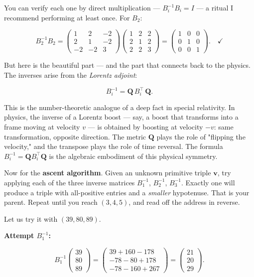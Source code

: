 You can verify each one by direct multiplication --- $B_i^{-1} B_i = I$ --- a ritual I recommend performing at least once. For $B_2$:

\[
B_2^{-1} B_2 = \begin{pmatrix} 1 & 2 & -2 \\ 2 & 1 & -2 \\ -2 & -2 & 3 \end{pmatrix} \begin{pmatrix} 1 & 2 & 2 \\ 2 & 1 & 2 \\ 2 & 2 & 3 \end{pmatrix} = \begin{pmatrix} 1 & 0 & 0 \\ 0 & 1 & 0 \\ 0 & 0 & 1 \end{pmatrix}. \quad \checkmark
\]

But here is the beautiful part --- and the part that connects back to the physics. The inverses arise from the \textit{Lorentz adjoint}:

\[
B_i^{-1} = \mathbf{Q} \, B_i^\top \, \mathbf{Q}.
\]

This is the number-theoretic analogue of a deep fact in special relativity. In physics, the inverse of a Lorentz boost --- say, a boost that transforms into a frame moving at velocity $v$ --- is obtained by boosting at velocity $-v$: same transformation, opposite direction. The metric $\mathbf{Q}$ plays the role of "flipping the velocity," and the transpose plays the role of time reversal. The formula $B_i^{-1} = \mathbf{Q} B_i^\top \mathbf{Q}$ is the algebraic embodiment of this physical symmetry.

Now for the \textbf{ascent algorithm}. Given an unknown primitive triple $\mathbf{v}$, try applying each of the three inverse matrices $B_1^{-1}$, $B_2^{-1}$, $B_3^{-1}$. Exactly one will produce a triple with all-positive entries and a \textit{smaller} hypotenuse. That is your parent. Repeat until you reach $(3, 4, 5)$, and read off the address in reverse.

Let us try it with $(39, 80, 89)$.

\textbf{Attempt $B_1^{-1}$:}

\[
B_1^{-1} \begin{pmatrix} 39 \\ 80 \\ 89 \end{pmatrix} = \begin{pmatrix} 39 + 160 - 178 \\ -78 - 80 + 178 \\ -78 - 160 + 267 \end{pmatrix} = \begin{pmatrix} 21 \\ 20 \\ 29 \end{pmatrix}.
\]

